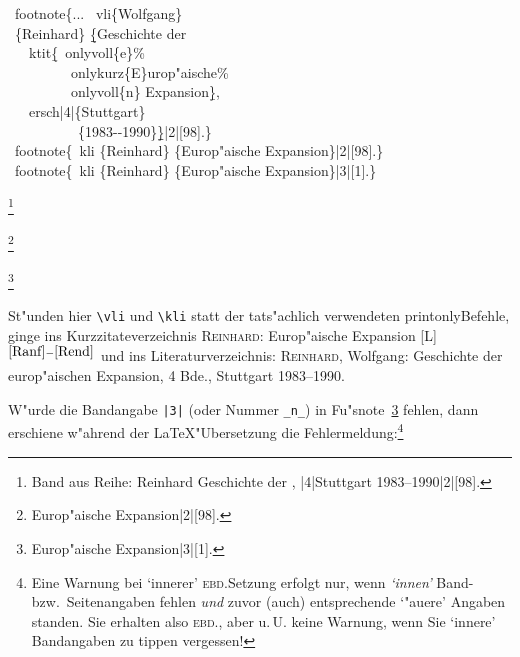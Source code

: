 \documentclass[12pt,a4paper]{article}
\newcommand{\pbs}{\string\ \unskip}
\newcommand{\bs}{\protect\pbs}
\begin{document}
\label{Reinhard}%
\Doppelbox
{\bs footnote\{... \bs vli\{Wolfgang\} 
 \\ \ \{Reinhard\} \b{\b{\{}}Geschichte der
 \\ \ \ \bs ktit\b{\{}\bs onlyvoll\{e\}\%
 \\ \ \ \ \ \ \ \ \ \bs onlykurz\{E\}urop"aische\%
 \\ \ \ \ \ \ \ \ \ \bs onlyvoll\{n\} Expansion\b{\}}, 
 \\ \ \ \bs ersch\string|4\string|\{Stuttgart\}
 \\ \ \ \ \ \ \ \ \ \ \ \{1983-{}-1990\}\b{\b{\}}}\string|2\string|[98].\}
 \\[1ex] \bs footnote\{\bs kli \{Reinhard\} \{Europ"aische Expansion\}\string|2\string|[98].\}
 \\[1ex] \bs footnote\{\bs kli \{Reinhard\} \{Europ"aische Expansion\}\string|3\string|[1].\}
}
{\vspace{1.5ex}%
 \footnote{Band aus Reihe: \notktitaddtok{} {Reinhard} {Geschichte der
 ,
 \ersch|4|{Stuttgart} {1983--1990}}|2|[98].\label{Ranf}}
 
 \footnote{ {Europ"aische Expansion}|2|[98].}
 
 \footnote{ {Europ"aische Expansion}|3|[1].\label{Rend}}
}

\noindent
St"unden hier \verb|\vli| und \verb|\kli| statt der
tats"achlich verwendeten printonly\hy Befehle, ginge ins Kurzzitateverzeichnis  
\textsc{Reinhard}: Europ"aische Expansion [L] \hspace{.5em} 
\textsf{\pageref{Ranf}$^{\ref{Ranf}-\ref{Rend}}$} 
und ins Literaturverzeichnis: 
\textsc{Reinhard}, Wolfgang: Geschichte der europ"aischen Expansion, 
4 Bde., Stuttgart 1983--1990.

\vspace{.1ex}
W"urde die Bandangabe \verb+|3|+ \hspace{.1em}(oder Nummer \hspace{-.3em}\verb+_n_+)\hspace{.1em} in 
Fu"snote~\ref{Rend} fehlen, dann erschiene w"ahrend der \LaTeX\hy "Ubersetzung die 
Fehlermeldung:\footnote{Eine Warnung bei `innerer' \textsc{ebd.}\hy Setzung erfolgt nur,
wenn \hspace{-.125em}\textit{`innen'} Band- bzw.\ Seitenangaben fehlen
\textit{und} zuvor (auch) entsprechende `"au\hyss ere' Angaben standen. Sie erhalten
also \textsc{ebd.}, aber u.\,U. keine Warnung, wenn Sie `innere'
Bandangaben zu tippen vergessen!}
\end{document}
